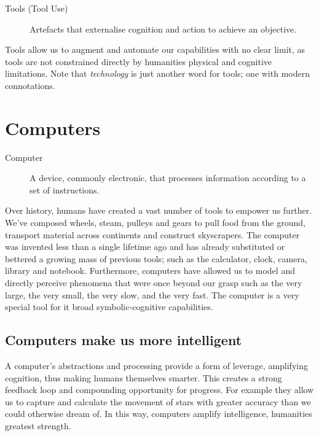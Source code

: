 \documentclass[logo,bsc,singlespacing,parskip]{infthesis}
\begin{document}
\begin{mdframed}
\begin{description}
\item[{Tools (Tool Use)}] Artefacts that externalise cognition and action to achieve an objective.
\end{description}
\end{mdframed}

Tools allow us to augment and automate our capabilities with no clear limit, as tools are not constrained directly by humanities physical and cognitive limitations.
Note that \emph{technology} is just another word for tools; one with modern connotations.
\chapter{Computers}
\label{sec:orgdf6dc6f}
\begin{mdframed}
\begin{description}
\item[{Computer\label{Computer}}] A device, commonly electronic, that processes information according to a set of instructions.
\end{description}
\end{mdframed}

Over history,  humans have created a vast number of tools to empower us further.
We've composed wheels, steam, pulleys and gears to pull food from the ground, transport material across continents and construct skyscrapers.
The computer was invented less than a single lifetime ago and has already substituted or bettered a growing mass of previous tools; such as the calculator, clock, camera, library and notebook.
Furthermore, computers have allowed us to model and directly perceive phenomena that were once beyond our grasp such as the very large, the very small, the very slow, and the very fast.
The computer is a very special tool for it broad symbolic-cognitive capabilities.
\section{Computers make us more intelligent}
\label{sec:org350fdd3}
A computer's abstractions and processing provide a form of leverage, amplifying cognition, thus making humans themselves smarter.
This creates a strong feedback loop and compounding opportunity for progress.
For example they allow us to capture and calculate the movement of stars with greater accuracy than we could otherwise dream of.
In this way, computers amplify intelligence, humanities greatest strength.
\end{document}

